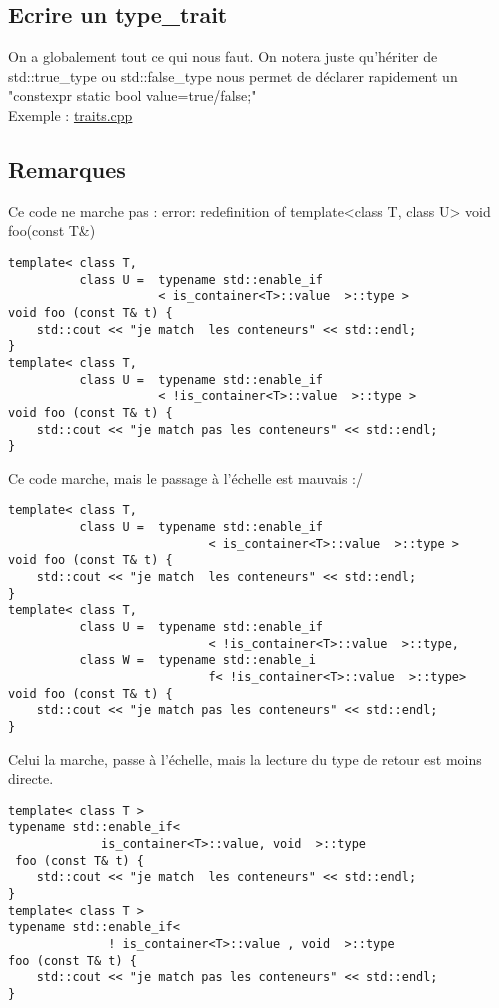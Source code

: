 \documentclass{beamer}
\begin{document}
\subsection{Ecrire un type\_trait}
\begin{frame}[containsverbatim]
On a globalement tout ce qui nous faut. On notera juste qu'hériter de std::true\_type ou std::false\_type nous permet de déclarer rapidement un "constexpr static bool value=true/false;"
\\
Exemple : \href{run:../code_demo/traits.cpp}{traits.cpp}\\

\end{frame}

\subsection{Remarques}
\begin{frame}[containsverbatim]
	Ce code ne marche pas : error: redefinition of template<class T, class U> void foo(const T\&)
	\begin{verbatim}
template< class T,
		  class U =  typename std::enable_if
		  			 < is_container<T>::value  >::type >
void foo (const T& t) {
    std::cout << "je match  les conteneurs" << std::endl;
}
template< class T, 
          class U =  typename std::enable_if
                     < !is_container<T>::value  >::type >
void foo (const T& t) {
    std::cout << "je match pas les conteneurs" << std::endl;
}
	\end{verbatim}
\end{frame}
\begin{frame}[containsverbatim]
	Ce code marche, mais le passage à l’échelle est mauvais :/
	\begin{verbatim}
template< class T, 
		  class U =  typename std::enable_if
		  					< is_container<T>::value  >::type >
void foo (const T& t) {
    std::cout << "je match  les conteneurs" << std::endl;
}
template< class T,
		  class U =  typename std::enable_if
		  					< !is_container<T>::value  >::type,
          class W =  typename std::enable_i
          					f< !is_container<T>::value  >::type>
void foo (const T& t) {
    std::cout << "je match pas les conteneurs" << std::endl;
}
	\end{verbatim}
\end{frame}
\begin{frame}[containsverbatim]
	Celui la marche, passe à l’échelle, mais la lecture du type de retour est moins directe. 
	\begin{verbatim}
template< class T >
typename std::enable_if< 
             is_container<T>::value, void  >::type
 foo (const T& t) {
    std::cout << "je match  les conteneurs" << std::endl;
}
template< class T >
typename std::enable_if< 
			  ! is_container<T>::value , void  >::type  
foo (const T& t) {
    std::cout << "je match pas les conteneurs" << std::endl;
}
	\end{verbatim}

\end{frame}
\end{document}
